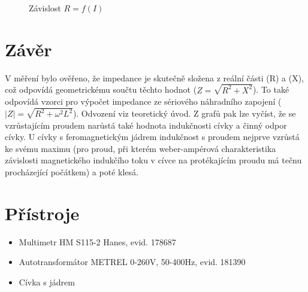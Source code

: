 \documentclass[12pt]{article} %
\begin{document}
\begin{figure}[H]
\centering
	\caption{Závislost $R=f(I)$}
\end{figure}

\newpage

\section{Závěr}
V měření bylo ověřeno, že impedance je skutečně složena z reální části (R) a (X), což odpovídá geometrickému součtu těchto hodnot ($Z=\sqrt{R^2+X^2}$). To také odpovídá vzorci pro výpočet impedance ze sériového náhradního zapojení ($|Z|=\sqrt{R^2+\omega^2L^2}$). Odvození viz teoretický úvod. Z grafů pak lze vyčíst, že se vzrůstajícím proudem narůstá také hodnota indukčnosti cívky a činný odpor cívky. U cívky s feromagnetickým jádrem indukčnost s proudem nejprve vzrůstá ke svému maximu (pro proud, při kterém weber-ampérová charakteristika závislosti magnetického indukčího toku v cívce na protékajícím proudu má tečnu procházející počátkem) a poté klesá.

\section{Přístroje}
\begin{itemize}
\item Multimetr HM S115-2 Hanes, evid. 178687
\item Autotransformátor METREL 0-260V, 50-400Hz, evid. 181390
\item Cívka s jádrem
\end{itemize}
\end{document}

